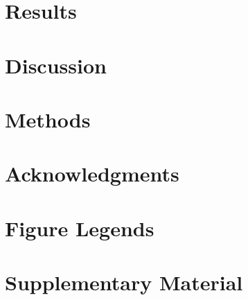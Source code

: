 \section{Results}


\section{Discussion}


\section{Methods}


\section{Acknowledgments}




\pagebreak
\section{Figure Legends}


\FloatBarrier

%
%
%
%


\pagebreak
\setcounter{secnumdepth}{4}
\section{Supplementary Material}

%
%

\FloatBarrier




%


\FloatBarrier
\pagebreak




